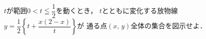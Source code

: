 \documentclass[../../main.tex]{subfiles}
\begin{document}
$t$が範囲$\displaystyle0<t\leqq\dfrac{1}{2}$を動くとき，
$t$とともに変化する放物線
$\displaystyle y=\dfrac{1}{2}\left\{ t+\dfrac{x(2-x)}{t} \right\}$が
通る点$(x, \, y)$全体の集合を図示せよ．
\end{document}
